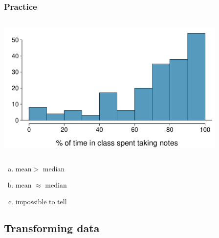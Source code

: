 \begin{frame}
\frametitle{Practice}


\vspace{-0.5cm}

\begin{columns}
\begin{center}
\includegraphics[width=0.9\textwidth]{2-1_numerical_data/figures/notes_perc/notes_perc_hist}
\end{center}
$\:$ \\
$\:$ \\
\end{columns}

{\small
\begin{multicols}{2}
\begin{enumerate}[(a)]
\item mean$>$ median
\item mean $\approx$ median
\item impossible to tell
\end{enumerate}
\end{multicols}
}

\end{frame}


\subsection{Transforming data}


